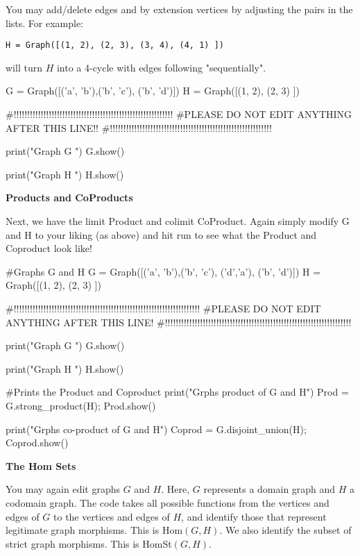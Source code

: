 \documentclass{ximera}
\begin{document}
 You may add/delete edges and by extension vertices by adjusting the pairs in the lists.  For example:

\begin{verbatim}
H = Graph([(1, 2), (2, 3), (3, 4), (4, 1) ])
\end{verbatim}

will turn $H$ into a 4-cycle with edges following "sequentially".     

\begin{sageCell}
G = Graph([('a', 'b'),('b', 'c'), ('b', 'd')])
H = Graph([(1, 2), (2, 3) ])

#!!!!!!!!!!!!!!!!!!!!!!!!!!!!!!!!!!!!!!!!!!!!!!!!!!!!!!!!!!!
#PLEASE DO NOT EDIT ANYTHING AFTER THIS LINE!!
#!!!!!!!!!!!!!!!!!!!!!!!!!!!!!!!!!!!!!!!!!!!!!!!!!!!!!!!!!!!!

print("\n\n Graph G \n")
G.show()

print("\n\n Graph H \n\n")
H.show()
\end{sageCell}


\textbf{Products and CoProducts}

Next, we have the limit Product and colimit CoProduct.  Again simply modify G and H to your liking (as above) and hit run to see what the Product and Coproduct look like!


\begin{sageCell}
#Graphs G and H
G = Graph([('a', 'b'),('b', 'c'), ('d','a'), ('b', 'd')])
H = Graph([(1, 2), (2, 3) ])

#!!!!!!!!!!!!!!!!!!!!!!!!!!!!!!!!!!!!!!!!!!!!!!!!!!!!!!!!!!!!!!!!!!!!!
#PLEASE DO NOT EDIT ANYTHING AFTER THIS LINE!
#!!!!!!!!!!!!!!!!!!!!!!!!!!!!!!!!!!!!!!!!!!!!!!!!!!!!!!!!!!!!!!!!!!!!!

print("\n\n Graph G \n")
G.show()


print("\n\n Graph H \n\n")
H.show()

#Prints the Product and Coproduct
print("Grphs product of G and H")
Prod = G.strong_product(H); Prod.show()

print("Grphs co-product of G and H")
Coprod = G.disjoint_union(H); Coprod.show()

\end{sageCell}

\textbf{The Hom Sets}

You may again edit graphs $G$ and $H$.   Here, $G$ represents a domain graph and $H$ a codomain graph.  The code takes all possible functions from the vertices and edges of $G$ to the vertices and edges of $H$, and identify those that represent legitimate graph morphisms.  This is Hom$(G, H)$.  We also identify the subset of strict graph morphisms.  This is HomSt$(G,H)$.
\end{document}
